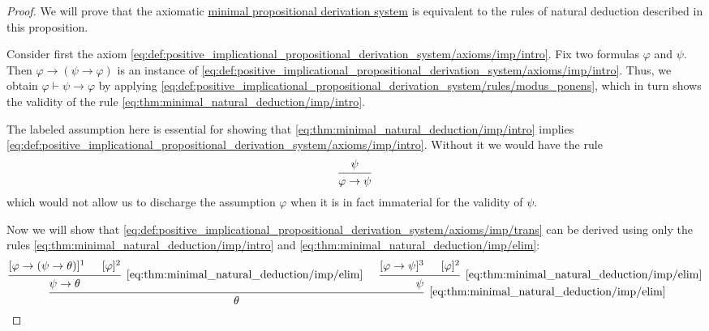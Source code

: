 \begin{proof}
  We will prove that the axiomatic \hyperref[def:minimal_propositional_derivation_system]{minimal propositional derivation system} is equivalent to the rules of natural deduction described in this proposition.

   Consider first the axiom \eqref{eq:def:positive_implicational_propositional_derivation_system/axioms/imp/intro}. Fix two formulas \( \varphi \) and \( \psi \). Then \( \varphi \rightarrow (\psi \rightarrow \varphi) \) is an instance of \eqref{eq:def:positive_implicational_propositional_derivation_system/axioms/imp/intro}. Thus, we obtain \( \varphi \vdash \psi \rightarrow \varphi \) by applying \eqref{eq:def:positive_implicational_propositional_derivation_system/rules/modus_ponens}, which in turn shows the validity of the rule \eqref{eq:thm:minimal_natural_deduction/imp/intro}.

  The labeled assumption here is essential for showing that \eqref{eq:thm:minimal_natural_deduction/imp/intro} implies \eqref{eq:def:positive_implicational_propositional_derivation_system/axioms/imp/intro}. Without it we would have the rule
  \begin{equation*}
    \begin{prooftree}
      \hypo{ \psi }
      \infer1{ \varphi \rightarrow \psi }
    \end{prooftree}
  \end{equation*}
  which would not allow us to discharge the assumption \( \varphi \) when it is in fact immaterial for the validity of \( \psi \).

  Now we will show that \eqref{eq:def:positive_implicational_propositional_derivation_system/axioms/imp/trans} can be derived using only the rules \eqref{eq:thm:minimal_natural_deduction/imp/intro} and \eqref{eq:thm:minimal_natural_deduction/imp/elim}:
  \begin{equation}\label{eq:thm:minimal_natural_deduction/imp/trans_derivation}
    \begin{prooftree}
      \hypo{ [\varphi \rightarrow (\psi \rightarrow \theta)]^1 }
      \hypo{ [\varphi]^2 }
      \infer2[\ref{eq:thm:minimal_natural_deduction/imp/elim}]{ \psi \rightarrow \theta }

      \hypo{ [\varphi \rightarrow \psi]^3 }
      \hypo{ [\varphi]^2 }
      \infer2[\ref{eq:thm:minimal_natural_deduction/imp/elim}]{ \psi }

      \infer2[\ref{eq:thm:minimal_natural_deduction/imp/elim}]{ \theta }


\end{prooftree}
\end{equation}
\end{proof}
